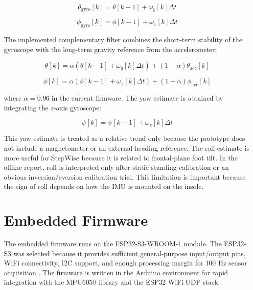 \begin{equation}
\theta_{\mathrm{gyro}}[k] = \theta[k-1] + \omega_y[k]\Delta t
\label{eq:gyro_pitch}
\end{equation}

\begin{equation}
\phi_{\mathrm{gyro}}[k] = \phi[k-1] + \omega_x[k]\Delta t
\label{eq:gyro_roll}
\end{equation}

The implemented complementary filter combines the short-term stability of the gyroscope with the long-term gravity reference from the accelerometer:

\begin{equation}
\theta[k] =
\alpha\left(\theta[k-1]+\omega_y[k]\Delta t\right)
+(1-\alpha)\theta_{\mathrm{acc}}[k]
\label{eq:comp_pitch}
\end{equation}

\begin{equation}
\phi[k] =
\alpha\left(\phi[k-1]+\omega_x[k]\Delta t\right)
+(1-\alpha)\phi_{\mathrm{acc}}[k]
\label{eq:comp_roll}
\end{equation}

where $\alpha=0.96$ in the current firmware. The yaw estimate is obtained by integrating the $z$-axis gyroscope:

\begin{equation}
\psi[k] = \psi[k-1] + \omega_z[k]\Delta t
\label{eq:yaw}
\end{equation}

This yaw estimate is treated as a relative trend only because the prototype does not include a magnetometer or an external heading reference. The roll estimate is more useful for StepWise because it is related to frontal-plane foot tilt. In the offline report, roll is interpreted only after static standing calibration or an obvious inversion/eversion calibration trial. This limitation is important because the sign of roll depends on how the IMU is mounted on the insole.

\section{Embedded Firmware}
\label{sec:embedded_firmware}

The embedded firmware runs on the ESP32-S3-WROOM-1 module. The ESP32-S3 was selected because it provides sufficient general-purpose input/output pins, WiFi connectivity, I2C support, and enough processing margin for 100 Hz sensor acquisition \cite{espressif_s3_datasheet}. The firmware is written in the Arduino environment for rapid integration with the MPU6050 library and the ESP32 WiFi UDP stack.

